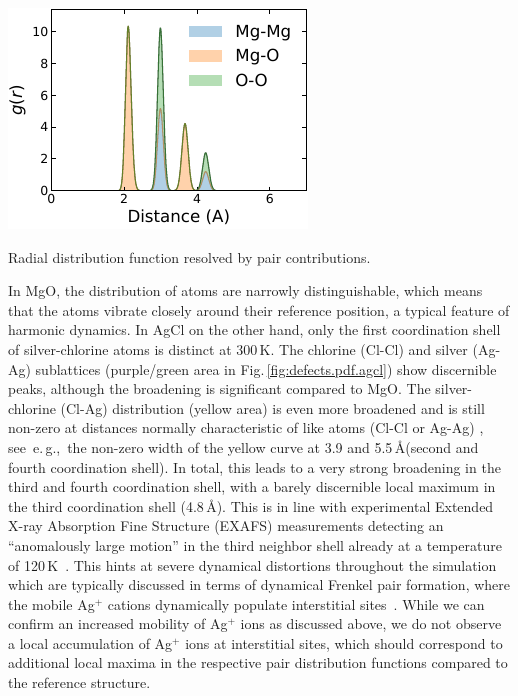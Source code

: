 %
\begin{marginfigure}
	\includegraphics[width=\textwidth]{./data/plots/pdfs/mgo_small.pdf}
	\caption{Radial distribution function resolved by pair contributions.}
	\label{fig:defects.pdf.mgo.small}
\end{marginfigure}
%
In MgO, the distribution of atoms are narrowly distinguishable, which means that the atoms vibrate closely around their reference position, a typical feature of harmonic dynamics. 
In AgCl on the other hand, only the first coordination shell of silver-chlorine atoms is distinct at 300\,K. The chlorine (Cl-Cl) and silver (Ag-Ag) sublattices (purple/green area in Fig.\,\ref{fig:defects.pdf.agcl}) show discernible peaks, although the broadening is significant compared to MgO. The silver-chlorine (Cl-Ag) distribution (yellow area) is even more broadened and is still non-zero at distances normally characteristic of like atoms (Cl-Cl or Ag-Ag) , see~e.\,g.,~the non-zero width of the yellow curve at 3.9 and 5.5\,\AA (second and fourth coordination shell). In total, this leads to a very strong broadening in the third and fourth coordination shell, with a barely discernible local maximum in the third coordination shell (4.8\,\AA).
This is in line with experimental Extended X-ray Absorption Fine Structure (EXAFS) measurements detecting an ``anomalously large motion'' in the third neighbor shell already at a temperature of 120\,K~\cite{Batchelor.1995}.
This hints at severe dynamical distortions throughout the simulation which are typically discussed in terms of dynamical Frenkel pair formation, where the mobile Ag$^+$ cations dynamically populate interstitial sites~\cite{Aboagye.1975,Andreoni.1983,Wilmer.1995,Mebane.2010}. While we can confirm an increased mobility of Ag$^+$ ions as discussed above, we do not observe a local accumulation of Ag$^+$ ions at interstitial sites, which should correspond to additional local maxima in the respective pair distribution functions compared to the reference structure. 
